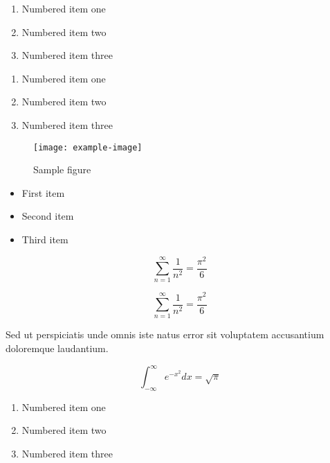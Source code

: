 \documentclass{article}
\begin{document}
\begin{enumerate}
\item Numbered item one
\item Numbered item two
\item Numbered item three
\end{enumerate}

\begin{enumerate}
\item Numbered item one
\item Numbered item two
\item Numbered item three
\end{enumerate}

\begin{figure}[h]
    \centering
    \texttt{[image: example-image]}
    \caption{Sample figure}
    \label{fig:sample}
\end{figure}

\begin{itemize}
\item First item
\item Second item
\item Third item
\end{itemize}

\begin{equation}
    \sum_{n=1}^{\infty} \frac{1}{n^2} = \frac{\pi^2}{6}
\end{equation}

\begin{equation}
    \sum_{n=1}^{\infty} \frac{1}{n^2} = \frac{\pi^2}{6}
\end{equation}


Sed ut perspiciatis unde omnis iste natus error sit voluptatem accusantium doloremque laudantium.

\begin{equation}
    \int_{-\infty}^{\infty} e^{-x^2} dx = \sqrt{\pi}
\end{equation}

\begin{enumerate}
\item Numbered item one
\item Numbered item two
\item Numbered item three
\end{enumerate}

\end{document}
